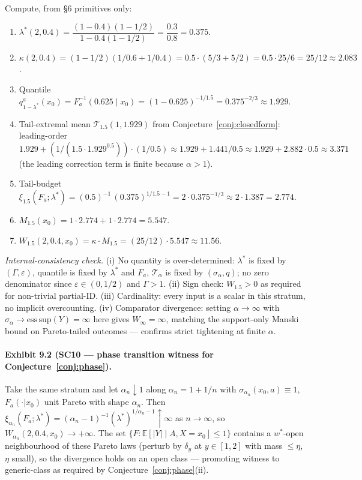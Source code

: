 \documentclass[11pt]{article}
\newcommand{\E}{\mathbb{E}}
\theoremstyle{definition}
\theoremstyle{plain}
\theoremstyle{remark}
\begin{document}
Compute, from \S6 primitives only:
\begin{enumerate}[leftmargin=2em,label=(\alph*)]
  \item $\lambda^*(2, 0.4) = \dfrac{(1-0.4)(1 - 1/2)}{1 - 0.4(1 - 1/2)} = \dfrac{0.3}{0.8} = 0.375$.
  \item $\kappa(2, 0.4) = (1 - 1/2)(1/0.6 + 1/0.4) = 0.5\cdot(5/3 + 5/2) = 0.5 \cdot 25/6 = 25/12 \approx 2.083$.
  \item Quantile $q^a_{1 - \lambda^*}(x_0) = F_a^{-1}(0.625 \mid x_0) = (1 - 0.625)^{-1/1.5} = 0.375^{-2/3} \approx 1.929$.
  \item Tail-extremal mean $\mathcal{T}_{1.5}(1, 1.929)$ from Conjecture~\ref{conj:closedform}: leading-order $1.929 + (1/(1.5 \cdot 1.929^{0.5})) \cdot (1/0.5) \approx 1.929 + 1.441/0.5 \approx 1.929 + 2.882 \cdot 0.5 \approx 3.371$ (the leading correction term is finite because $\alpha > 1$).
  \item Tail-budget $\xi_{1.5}(F_a;\lambda^*) = (0.5)^{-1}\,(0.375)^{1/1.5 - 1} = 2 \cdot 0.375^{-1/3} \approx 2 \cdot 1.387 = 2.774$.
  \item $M_{1.5}(x_0) = 1 \cdot 2.774 + 1 \cdot 2.774 = 5.547$.
  \item $W_{1.5}(2, 0.4, x_0) = \kappa \cdot M_{1.5} = (25/12) \cdot 5.547 \approx 11.56$.
\end{enumerate}

\emph{Internal-consistency check.} (i) No quantity is over-determined: $\lambda^*$ is fixed by $(\Gamma,\varepsilon)$, quantile is fixed by $\lambda^*$ and $F_a$, $\mathcal{T}_\alpha$ is fixed by $(\sigma_\alpha, q)$; no zero denominator since $\varepsilon \in (0,1/2)$ and $\Gamma > 1$. (ii) Sign check: $W_{1.5} > 0$ as required for non-trivial partial-ID. (iii) Cardinality: every input is a scalar in this stratum, no implicit overcounting. (iv) Comparator divergence: setting $\alpha \to \infty$ with $\sigma_\alpha \to \mathrm{ess\,sup}(Y) = \infty$ here gives $W_\infty = \infty$, matching the support-only Manski bound on Pareto-tailed outcomes — confirms strict tightening at finite $\alpha$.

\paragraph{Exhibit 9.2 (SC10 — phase transition witness for Conjecture~\ref{conj:phase}).}
Take the same stratum and let $\alpha_n \downarrow 1$ along $\alpha_n = 1 + 1/n$ with $\sigma_{\alpha_n}(x_0,a) \equiv 1$, $F_a(\cdot|x_0)$ unit Pareto with shape $\alpha_n$. Then $\xi_{\alpha_n}(F_a;\lambda^*) = (\alpha_n - 1)^{-1} (\lambda^*)^{1/\alpha_n - 1} \uparrow \infty$ as $n \to \infty$, so $W_{\alpha_n}(2, 0.4, x_0) \to +\infty$. The set $\{F : \E[|Y|\mid A,X = x_0] \le 1\}$ contains a $w^*$-open neighbourhood of these Pareto laws (perturb by $\delta_{y}$ at $y \in [1,2]$ with mass $\le \eta$, $\eta$ small), so the divergence holds on an open class — promoting witness to generic-class as required by Conjecture~\ref{conj:phase}(ii).
\end{document}
